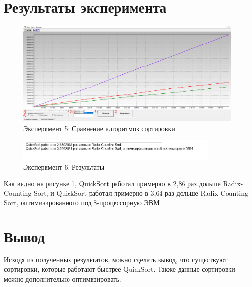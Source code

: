 \section{Результаты эксперимента}
\begin{figure}[ht!]
    \centering
    \includegraphics[width=170mm]{./img/6.png}
    \caption{Эксперимент 5: Сравнение алгоритмов сортировки}
\end{figure}

\begin{figure}[ht!]
    \centering
    \includegraphics[width=100mm]{./img/06.png}
    \caption{Эксперимент 6: Результаты\label{res_06}}
\end{figure}

Как видно на рисунке \ref{res_06}, QuickSort работал примерно в 2,86 раз дольше Radix-Counting Sort, и QuickSort работал примерно в 3,64 раз дольше Radix-Counting Sort, оптимизированного под 8-процессорную ЭВМ.

\section{Вывод}
Исходя из полученных результатов, можно сделать вывод, что существуют сортировки, которые работают быстрее QuickSort. Также данные сортировки можно дополнительно оптимизировать.